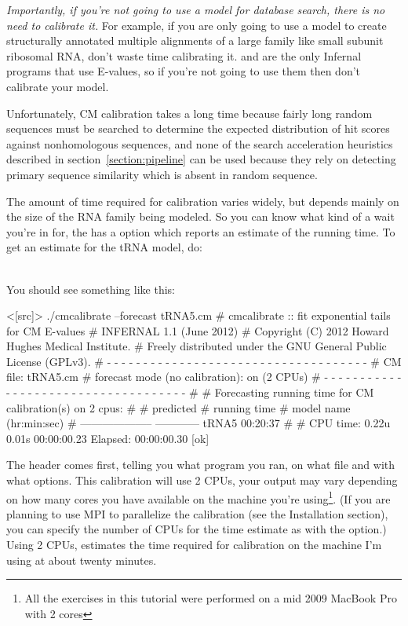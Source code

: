 \emph{Importantly, if you're not going to use a model for database
search, there is no need to calibrate it.} For example, if you are
only going to use a model to create structurally annotated multiple
alignments of a large family like small subunit ribosomal RNA, don't
waste time calibrating it.  and  are the
only Infernal programs that use E-values, so if you're not going to
use them then don't calibrate your model.

Unfortunately, CM calibration takes a long time because fairly long
random sequences must be searched to determine the expected
distribution of hit scores against nonhomologous sequences, and none
of the search acceleration heuristics described in
section~\ref{section:pipeline} can be used because they rely on
detecting primary sequence similarity which is absent in random
sequence. 

The amount of time required for calibration varies widely, but
depends mainly on the size of the RNA family being modeled.
So you can know what kind of a wait you're in for, the
 has a  option which reports an
estimate of the running time. To get an estimate for the tRNA model, do:

\\

You should see something like this:

\begin{sreoutput}
<[src]> ./cmcalibrate --forecast tRNA5.cm
# cmcalibrate :: fit exponential tails for CM E-values
# INFERNAL 1.1 (June 2012)
# Copyright (C) 2012 Howard Hughes Medical Institute.
# Freely distributed under the GNU General Public License (GPLv3).
# - - - - - - - - - - - - - - - - - - - - - - - - - - - - - - - - - - - -
# CM file:                                     tRNA5.cm
# forecast mode (no calibration):              on (2 CPUs)
# - - - - - - - - - - - - - - - - - - - - - - - - - - - - - - - - - - - -
#
# Forecasting running time for CM calibration(s) on 2 cpus:
#
#                          predicted
#                       running time
# model name            (hr:min:sec)
# --------------------  ------------
  tRNA5                     00:20:37
#
# CPU time: 0.22u 0.01s 00:00:00.23 Elapsed: 00:00:00.30
[ok]
\end{sreoutput}

The header comes first, telling you what program you ran, on what file
and with what options. This calibration will use 2 CPUs, your output
may vary depending on how many cores you have available on the machine
you're using\footnote{All the exercises in this tutorial were
  performed on a mid 2009 MacBook Pro with 2 cores}. (If you are
planning to use MPI to parallelize the calibration (see the
Installation section), you can specify the number of CPUs for the time
estimate as  with the  option.) Using
2 CPUs,  estimates the time required for calibration
on the machine I'm using at about twenty minutes.

